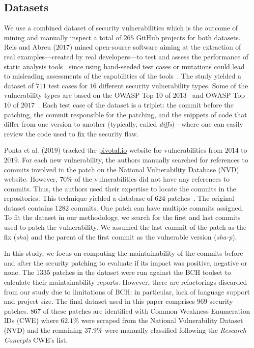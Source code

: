 \documentclass[10pt,conference]{IEEEtran}
\begin{document}
\subsection{Datasets}
%
We use a combined dataset of security vulnerabilities which is 
the outcome of mining and manually inspect a total of $265$ GitHub projects for both
datasets. Reis and Abreu 
($2017$) mined open-source
software aiming at the extraction of real examples---created by real
developers---to test and assess the performance of static analysis tools~\cite{Reis:2017:IJSSE} since
using hand-seeded test cases or mutations could lead to misleading assessments
of the capabilities of the tools~\cite{just2014mutants}. The study yielded a
dataset of $711$ test cases for $16$ different security vulnerability types. Some of the vulnerability types
are based on the OWASP Top $10$ of $2013$~\cite{oswap:2013} and OWASP Top $10$ of
$2017$~\cite{oswap:2017}. Each test case of the
dataset is a triplet: the commit before the patching, the commit responsible
for the patching, and the snippets of code that differ from one version to
another (typically, called \textit{diffs})---where one can easily review the
code used to fix the security flaw. 
%

Ponta et al. ($2019$) tracked the \url{pivotal.io} website for vulnerabilities 
from $2014$ to $2019$. For each new vulnerability, the authors manually searched 
for references to commits involved in the patch on the National Vulnerability 
Database (NVD) website. However, $70\%$
of the vulnerabilities did not have any references to commits. Thus, the authors
used their expertise to locate the commits in the repositories. This technique 
yielded a database of $624$ patches~\cite{10.1109/MSR.2019.00064}. The original 
dataset contains $1282$ commits. One patch can have multiple commits assigned.
To fit the dataset in our methodology, we search for the first and last commits
used to patch the vulnerability. We assumed the last commit of the patch as 
the fix (\emph{sha}) and the parent of the first commit as the vulnerable version 
(\emph{sha-p}).
%

In this study, we focus on computing the
maintainability of the commits before and after the security patching to
evaluate if its impact was positive, negative or none.
The $1335$ patches in the dataset were run against the BCH toolset to
calculate their maintainability reports. However, there are refactorings
discarded from our study due to limitations of BCH: in particular, lack of
language support and project size. The final dataset used in this paper comprises
$969$ security patches. $867$ of these patches are identified with Common Weakness
Enumeration IDs (CWE) where $62.1\%$ were scraped from the National Vulnerability 
Dataset (NVD) and the remaining $37.9\%$ were manually classified following the 
\emph{Research Concepts} CWE's list.
\end{document}
